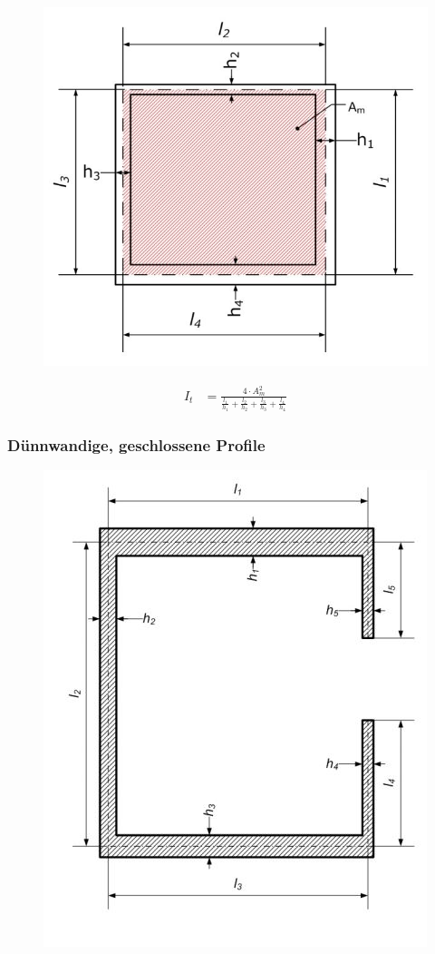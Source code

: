 \begin{figure}[h]
	\centering
	\includegraphics[scale=0.6]{Torsion_2.jpg}
\end{figure}


\begin{align*}
I_t &= \frac{4 \cdot A_m^2}{\frac{l_1}{h_1} + \frac{l_2}{h_2} + \frac{l_3}{h_3} + \frac{l_4}{h_4}}
\end{align*}


\subsubsection*{Dünnwandige, geschlossene Profile}


\begin{figure}[h]
	\centering
	\includegraphics[scale=0.6]{Torsion_3.jpg}
\end{figure}


